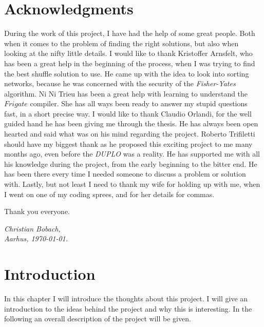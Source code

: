 \documentclass[twoside,11pt,openright]{report}
\newcommand{\FY}{\textit{Fisher-Yates} }
\newcommand{\DUPLO}{\textit{DUPLO} }
\begin{document}
\chapter*{Acknowledgments}
During the work of this project, I have had the help of some great people. Both when it comes to the problem of finding the right solutions, but also when looking at the nifty little details. I would like to thank Kristoffer Arnsfelt, who has been a great help in the beginning of the process, when I was trying to find the best shuffle solution to use. He came up with the idea to look into sorting networks, because he was concerned with the security of the \FY algorithm. Ni Ni Trieu has been a great help with learning to understand the $Frigate$ compiler. She has all ways been ready to answer my stupid questions fast, in a short precise way. I would like to thank Claudio Orlandi, for the well guided hand he has been giving me through the thesis. He has always been open hearted and said what was on his mind regarding the project. Roberto Trifiletti should have my biggest thank as he proposed this exciting project to me many months ago, even before the \DUPLO was a reality. He has supported me with all his knowledge during the project, from the early beginning to the bitter end. He has been there every time I needed someone to discuss a problem or solution with. Lastly, but not least I need to thank my wife for holding up with me, when I went on one of my coding sprees, and for her details for commas.

Thank you everyone.

\vspace{2ex}
\begin{flushright}
  \emph{Christian Bobach,}\\
  \emph{Aarhus, \today.}
\end{flushright}

\tableofcontents
{}
\setcounter{secnumdepth}{2}

\chapter{Introduction}
\label{ch:intro}

In this chapter I will introduce the thoughts about this project. I will give an introduction to the ideas behind the project and why this is interesting. In the following an overall description of the project will be given.
\end{document}
